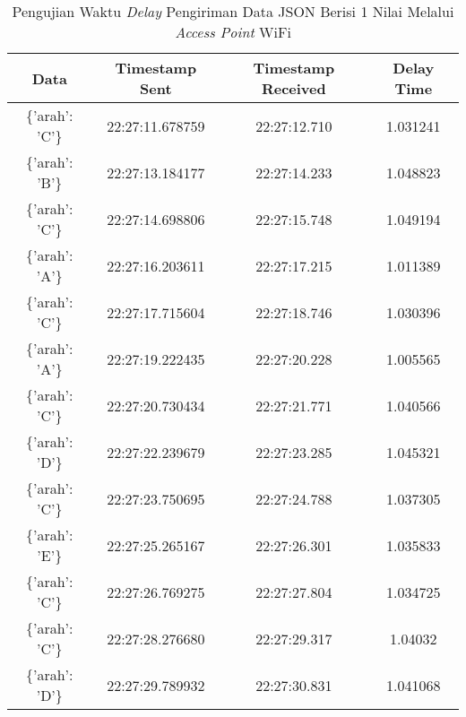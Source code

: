 \begin{longtable}{|ccc|c|}
  \caption{Pengujian Waktu \emph{Delay} Pengiriman Data JSON Berisi 1 Nilai Melalui \emph{Access Point} WiFi}
  \label{tbl:delayWiFiJSON1}\\
    \hline
    \multicolumn{1}{|c|}{Data}            & \multicolumn{1}{c|}{Timestamp Sent}  & Timestamp Received & Delay Time  \\ \hline
    \endfirsthead
    \endhead
    \multicolumn{1}{|c|}{\{'arah': 'C'\}} & \multicolumn{1}{c|}{22:27:11.678759} & 22:27:12.710       & 1.031241    \\ \hline
    \multicolumn{1}{|c|}{\{'arah': 'B'\}} & \multicolumn{1}{c|}{22:27:13.184177} & 22:27:14.233       & 1.048823    \\ \hline
    \multicolumn{1}{|c|}{\{'arah': 'C'\}} & \multicolumn{1}{c|}{22:27:14.698806} & 22:27:15.748       & 1.049194    \\ \hline
    \multicolumn{1}{|c|}{\{'arah': 'A'\}} & \multicolumn{1}{c|}{22:27:16.203611} & 22:27:17.215       & 1.011389    \\ \hline
    \multicolumn{1}{|c|}{\{'arah': 'C'\}} & \multicolumn{1}{c|}{22:27:17.715604} & 22:27:18.746       & 1.030396    \\ \hline
    \multicolumn{1}{|c|}{\{'arah': 'A'\}} & \multicolumn{1}{c|}{22:27:19.222435} & 22:27:20.228       & 1.005565    \\ \hline
    \multicolumn{1}{|c|}{\{'arah': 'C'\}} & \multicolumn{1}{c|}{22:27:20.730434} & 22:27:21.771       & 1.040566    \\ \hline
    \multicolumn{1}{|c|}{\{'arah': 'D'\}} & \multicolumn{1}{c|}{22:27:22.239679} & 22:27:23.285       & 1.045321    \\ \hline
    \multicolumn{1}{|c|}{\{'arah': 'C'\}} & \multicolumn{1}{c|}{22:27:23.750695} & 22:27:24.788       & 1.037305    \\ \hline
    \multicolumn{1}{|c|}{\{'arah': 'E'\}} & \multicolumn{1}{c|}{22:27:25.265167} & 22:27:26.301       & 1.035833    \\ \hline
    \multicolumn{1}{|c|}{\{'arah': 'C'\}} & \multicolumn{1}{c|}{22:27:26.769275} & 22:27:27.804       & 1.034725    \\ \hline
    \multicolumn{1}{|c|}{\{'arah': 'C'\}} & \multicolumn{1}{c|}{22:27:28.276680} & 22:27:29.317       & 1.04032     \\ \hline
    \multicolumn{1}{|c|}{\{'arah': 'D'\}} & \multicolumn{1}{c|}{22:27:29.789932} & 22:27:30.831       & 1.041068    \\ \hline

\end{longtable}
